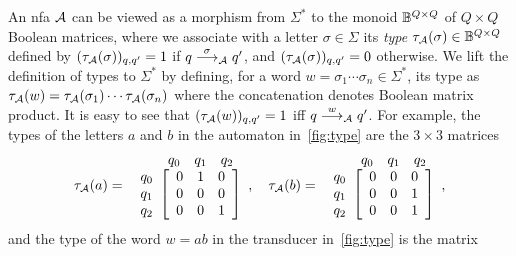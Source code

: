 An \gls{nfa} $\mathcal{A}$ can be viewed as a morphism from $\Sigma^*$ to the monoid $\mathbb{B}^{Q\times Q}$ of $Q\times Q$ Boolean matrices, where we associate with a letter $\sigma\in \Sigma$ its \emph{type} $\tau_{\mathcal{A}}(\sigma)\in \mathbb{B}^{Q\times Q}$ defined by $(\tau_{\mathcal{A}}(\sigma))_{q,q'}=1$ if $q\stackrel{\sigma}{\longrightarrow}_{\mathcal{A}}q'$, and $(\tau_{\mathcal{A}}(\sigma))_{q,q'}=0$ otherwise.
We lift the definition of types to $\Sigma^*$ by defining, for a word $w=\sigma_1\cdots \sigma_n\in \Sigma^*$, its type as $\tau_{\mathcal{A}}(w)=\tau_{\mathcal{A}}(\sigma_1)\cdots \tau_{\mathcal{A}}(\sigma_n)$ where the concatenation denotes Boolean matrix product. It is easy to see that $(\tau_{\mathcal{A}}(w))_{q,q'}=1$ iff $q\stackrel{w}{\longrightarrow}_{\mathcal{A}}q'$.
For example, the types of the letters $a$ and $b$ in the automaton in~\cref{fig:type} are the $3\times 3$ matrices
\[
\tau_\cA(a)=
\begin{array}{r@{}c}
    & \begin{array}{c c c} q_0 & q_1 & q_2 \end{array} \\
    \begin{array}{r}
    q_0 \\
    q_1 \\
    q_2 \\
    \end{array}
    & \left[ \begin{array}{ c c c }
        0 & 1 & 0 \\
        0 & 0 & 0 \\
        0 & 0 & 1 \\
    \end{array} \right]
\end{array}, \quad
\tau_\cA(b)=
\begin{array}{r@{}c}
    & \begin{array}{c c c} q_0 & q_1 & q_2 \end{array} \\
    \begin{array}{r}
    q_0 \\
    q_1 \\
    q_2 \\
    \end{array}
    & \left[ \begin{array}{ c c c }
        0 & 0 & 0 \\
        0 & 0 & 1 \\
        0 & 0 & 1 \\
    \end{array} \right]
\end{array},
\]
and the type of the word $w=ab$ in the transducer in~\cref{fig:type} is the matrix
